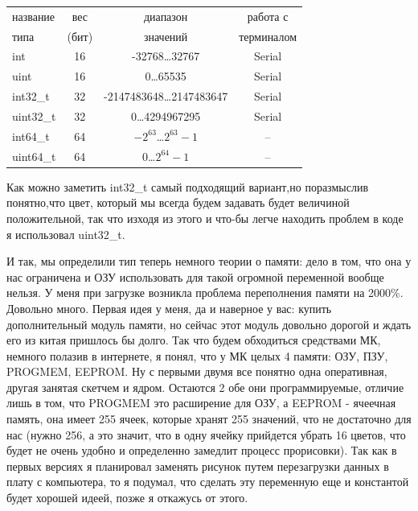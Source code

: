 \documentclass[a4paper, 12pt]{article}
\begin{document}
\begin{center}
  \begin{tabular}{|l|c|c|c|}
    \hline
    название                & вес   & диапазон                   & работа с   \\
    типа                    & (бит) & значений                   & терминалом \\
    \hline
    int                     & 16    & -32768\dots32767           & Serial     \\
    \hline
    uint                    & 16    & 0\dots65535                & Serial     \\
    \hline
    int32\_t                & 32    & -2147483648\dots2147483647 & Serial     \\
    \hline
    uint32\_t               & 32    & 0\dots4294967295           & Serial     \\
    \hline
    int64\_t                & 64    & $-2^{63}$\dots$2^{63}-1$   & --         \\
    \hline
    uint64\_t               & 64    & 0\dots$2^{64}-1$           & --         \\
    \hline
  \end{tabular}
\end{center}
Как можно заметить int32\_t самый подходящий вариант,но поразмыслив понятно,что
цвет, который мы всегда будем задавать будет величиной положительной, так что
изходя из этого и что-бы легче находить проблем в коде я использовал uint32\_t.

И так, мы определили тип теперь немного теории о памяти: дело в том, что она у
нас ограничена и ОЗУ использовать для такой огромной переменной вообще нельзя.
У меня при загрузке возникла проблема переполнения памяти на 2000\%. Довольно
много. Первая идея у меня, да и наверное у вас: купить дополнительный модуль
памяти, но сейчас этот модуль довольно дорогой и ждать его из китая пришлось
бы долго. Так что будем обходиться средствами МК, немного полазив в интернете,
я понял, что у МК целых 4 памяти: ОЗУ, ПЗУ, PROGMEM, EEPROM. Ну с первыми двумя
все понятно одна оперативная, другая занятая скетчем и ядром. Остаются 2
обе они программируемые, отличие лишь в том, что PROGMEM это расширение для
ОЗУ, а EEPROM - ячеечная память, она имеет 255 ячеек, которые хранят 255
значений, что не достаточно для нас (нужно 256, а это значит, что в одну
ячейку прийдется убрать 16 цветов, что будет не очень удобно и определенно
замедлит процесс прорисовки). Так как в первых версиях я планировал заменять
рисунок путем перезагрузки данных в плату с компьютера, то я подумал, что
сделать эту переменную еще и константой будет хорошей идеей, позже я откажусь
от этого.
\end{document}
